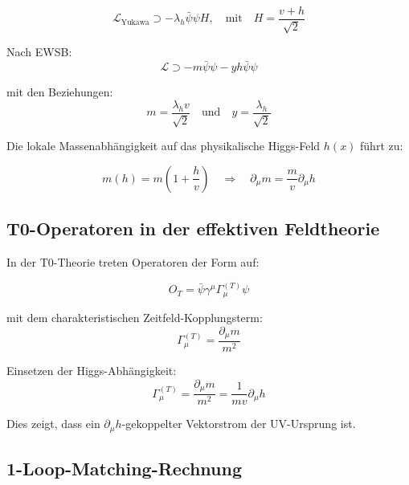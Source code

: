 \documentclass[12pt,a4paper]{article}
\begin{document}
	\begin{equation}
		\mathcal{L}_{\text{Yukawa}} \supset -\lambda_h \bar{\psi}\psi H, \quad \text{mit} \quad H = \frac{v + h}{\sqrt{2}}
	\end{equation}
	
	Nach EWSB:
	\begin{equation}
		\mathcal{L} \supset -m \bar{\psi}\psi - y h \bar{\psi}\psi
	\end{equation}
	
	mit den Beziehungen:
	\begin{equation}
		m = \frac{\lambda_h v}{\sqrt{2}} \quad \text{und} \quad y = \frac{\lambda_h}{\sqrt{2}}
	\end{equation}
	
	Die lokale Massenabhängigkeit auf das physikalische Higgs-Feld $h(x)$ führt zu:
	
	\begin{equation}
		m(h) = m\left(1 + \frac{h}{v}\right) \quad \Rightarrow \quad \partial_\mu m = \frac{m}{v}\partial_\mu h
	\end{equation}
	
	\subsection{T0-Operatoren in der effektiven Feldtheorie}
	\label{subsec:t0_operators}
	
	In der T0-Theorie treten Operatoren der Form auf:
	
	\begin{equation}
		O_T = \bar{\psi}\gamma^\mu\Gamma_\mu^{(T)}\psi
	\end{equation}
	
	mit dem charakteristischen Zeitfeld-Kopplungsterm:
	\begin{equation}
		\Gamma_\mu^{(T)} = \frac{\partial_\mu m}{m^2}
	\end{equation}
	
	Einsetzen der Higgs-Abhängigkeit:
	\begin{equation}
		\Gamma_\mu^{(T)} = \frac{\partial_\mu m}{m^2} = \frac{1}{mv}\partial_\mu h
	\end{equation}
	
	Dies zeigt, dass ein $\partial_\mu h$-gekoppelter Vektorstrom der UV-Ursprung ist.
	
	\subsection{1-Loop-Matching-Rechnung}
	\label{subsec:one_loop_matching}
	
\end{document}

